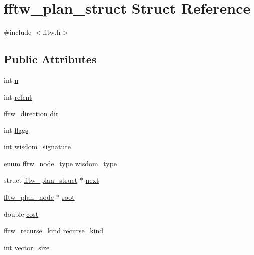 \hypertarget{structfftw__plan__struct}{\section{fftw\-\_\-plan\-\_\-struct Struct Reference}
\label{structfftw__plan__struct}
}


{\ttfamily \#include $<$fftw.\-h$>$}

\subsection*{Public Attributes}
\begin{DoxyCompactItemize}
\item 
int \hyperlink{structfftw__plan__struct_a13ec77a105b6c2e62add092d1d2de42c}{n}
\item 
int \hyperlink{structfftw__plan__struct_a0f0cfe0f1312f8e5cfe2d4119070e547}{refcnt}
\item 
\hyperlink{fftw_8h_addfba51b1dc43e3660873b1ba9668cec}{fftw\-\_\-direction} \hyperlink{structfftw__plan__struct_ad01c0441a28c1e72360a6b42f6d63689}{dir}
\item 
int \hyperlink{structfftw__plan__struct_a437b5a527bdd148ae864289d5d173811}{flags}
\item 
int \hyperlink{structfftw__plan__struct_ac742b7d89ff272d35384c0fd4d82e332}{wisdom\-\_\-signature}
\item 
enum \hyperlink{fftw_8h_a62ecac3f39269a2efca878ca819349f1}{fftw\-\_\-node\-\_\-type} \hyperlink{structfftw__plan__struct_ab5226ce275144b46887c740ab90b79dd}{wisdom\-\_\-type}
\item 
struct \hyperlink{structfftw__plan__struct}{fftw\-\_\-plan\-\_\-struct} $\ast$ \hyperlink{structfftw__plan__struct_a626c58bf93a8b08eba8826ecc0c48781}{next}
\item 
\hyperlink{fftw_8h_a5a57076cc01d385442d34098af60d05c}{fftw\-\_\-plan\-\_\-node} $\ast$ \hyperlink{structfftw__plan__struct_a3dd4d10e8be63c41d51cf5f021501bd0}{root}
\item 
double \hyperlink{structfftw__plan__struct_af99ad45f9bb1e7847dad9df5e4265ba8}{cost}
\item 
\hyperlink{fftw_8h_a268a1378954bfc3a1e2218319c2ebc87}{fftw\-\_\-recurse\-\_\-kind} \hyperlink{structfftw__plan__struct_a7bba7ff2c4889a1e021e94e5cbcea933}{recurse\-\_\-kind}
\item 
int \hyperlink{structfftw__plan__struct_a0854f855d1c241736acd8a619cb5baa2}{vector\-\_\-size}
\end{DoxyCompactItemize}


